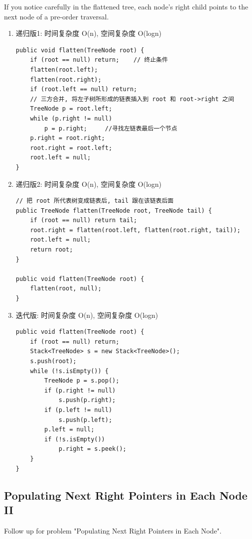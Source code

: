 \documentclass[12pt]{book}
\begin{document}
If you notice carefully in the flattened tree, each node's right child points to the next node of a pre-order traversal.
\begin{enumerate}
\item 递归版1: 时间复杂度 O(n), 空间复杂度 O(logn)
\label{sec-4-2-11-1}

\lstset{language=java,label= ,caption= ,numbers=none}
\begin{lstlisting}
public void flatten(TreeNode root) {
    if (root == null) return;    // 终止条件
    flatten(root.left);
    flatten(root.right);
    if (root.left == null) return;
    // 三方合并, 将左子树所形成的链表插入到 root 和 root->right 之间
    TreeNode p = root.left;
    while (p.right != null) 
        p = p.right;     //寻找左链表最后一个节点
    p.right = root.right;
    root.right = root.left;
    root.left = null;
}
\end{lstlisting}

\item 递归版2: 时间复杂度 O(n), 空间复杂度 O(logn)
\label{sec-4-2-11-2}

\lstset{language=java,label= ,caption= ,numbers=none}
\begin{lstlisting}
// 把 root 所代表树变成链表后, tail 跟在该链表后面
public TreeNode flatten(TreeNode root, TreeNode tail) {
    if (root == null) return tail;
    root.right = flatten(root.left, flatten(root.right, tail));
    root.left = null;
    return root;
}
        
public void flatten(TreeNode root) {
    flatten(root, null);
}
\end{lstlisting}

\item 迭代版: 时间复杂度 O(n), 空间复杂度 O(logn)
\label{sec-4-2-11-3}

\lstset{language=java,label= ,caption= ,numbers=none}
\begin{lstlisting}
public void flatten(TreeNode root) {
    if (root == null) return;
    Stack<TreeNode> s = new Stack<TreeNode>();
    s.push(root);
    while (!s.isEmpty()) {
        TreeNode p = s.pop();
        if (p.right != null)
            s.push(p.right);
        if (p.left != null)
            s.push(p.left);
        p.left = null;
        if (!s.isEmpty())
            p.right = s.peek();
    }
}
\end{lstlisting}
\end{enumerate}

\subsection{Populating Next Right Pointers in Each Node II}
\label{sec-4-2-12}
Follow up for problem "Populating Next Right Pointers in Each Node".
\end{document}
